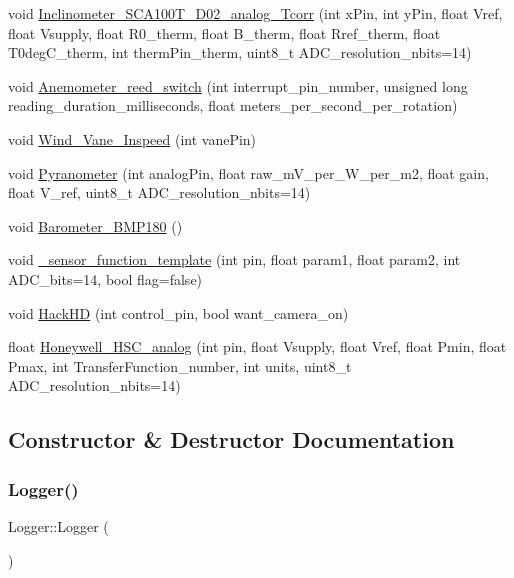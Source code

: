 \begin{DoxyCompactItemize}
\item 
void \hyperlink{classLogger_a80fdea5a339573980f9544ac64678411}{Inclinometer\+\_\+\+S\+C\+A100\+T\+\_\+\+D02\+\_\+analog\+\_\+\+Tcorr} (int x\+Pin, int y\+Pin, float Vref, float Vsupply, float R0\+\_\+therm, float B\+\_\+therm, float Rref\+\_\+therm, float T0deg\+C\+\_\+therm, int therm\+Pin\+\_\+therm, uint8\+\_\+t A\+D\+C\+\_\+resolution\+\_\+nbits=14)
\item 
void \hyperlink{classLogger_a6c6a43a1b86f88c2a5e33d14c992e510}{Anemometer\+\_\+reed\+\_\+switch} (int interrupt\+\_\+pin\+\_\+number, unsigned long reading\+\_\+duration\+\_\+milliseconds, float meters\+\_\+per\+\_\+second\+\_\+per\+\_\+rotation)
\item 
void \hyperlink{classLogger_a31c3cba5ff5722fb66bf540bfbe8b25d}{Wind\+\_\+\+Vane\+\_\+\+Inspeed} (int vane\+Pin)
\item 
void \hyperlink{classLogger_ae4190ce7ccfd7b148a6151102a3bf93d}{Pyranometer} (int analog\+Pin, float raw\+\_\+m\+V\+\_\+per\+\_\+\+W\+\_\+per\+\_\+m2, float gain, float V\+\_\+ref, uint8\+\_\+t A\+D\+C\+\_\+resolution\+\_\+nbits=14)
\item 
void \hyperlink{classLogger_a40588117a274f0c6de926ef6ce1f0ba8}{Barometer\+\_\+\+B\+M\+P180} ()
\item 
void \hyperlink{classLogger_a98f3cc370c87d1e1eaf3eb6a7e0f1623}{\+\_\+sensor\+\_\+function\+\_\+template} (int pin, float param1, float param2, int A\+D\+C\+\_\+bits=14, bool flag=false)
\item 
void \hyperlink{classLogger_a923b296832bd4222da649ebc66427ac1}{Hack\+HD} (int control\+\_\+pin, bool want\+\_\+camera\+\_\+on)
\item 
float \hyperlink{classLogger_a9808967fdf91f10602aa883df35145b3}{Honeywell\+\_\+\+H\+S\+C\+\_\+analog} (int pin, float Vsupply, float Vref, float Pmin, float Pmax, int Transfer\+Function\+\_\+number, int units, uint8\+\_\+t A\+D\+C\+\_\+resolution\+\_\+nbits=14)
\end{DoxyCompactItemize}


\subsection{Constructor \& Destructor Documentation}
\mbox{\label{classLogger_abc41bfb031d896170c7675fa96a6b30c}} 
\subsubsection{\texorpdfstring{Logger()}{Logger()}}
{\footnotesize\ttfamily Logger\+::\+Logger (\begin{DoxyParamCaption}{ }\end{DoxyParamCaption})}



